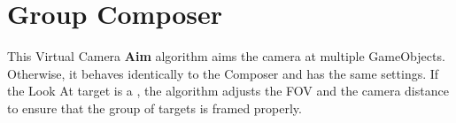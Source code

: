 \chapter{Group Composer}
\hypertarget{md__hey_tea_9_2_library_2_package_cache_2com_8unity_8cinemachine_0d2_89_87_2_documentation_0i_2_cinemachine_aim_group_composer}{}\label{md__hey_tea_9_2_library_2_package_cache_2com_8unity_8cinemachine_0d2_89_87_2_documentation_0i_2_cinemachine_aim_group_composer}
\label{md__hey_tea_9_2_library_2_package_cache_2com_8unity_8cinemachine_0d2_89_87_2_documentation_0i_2_cinemachine_aim_group_composer_autotoc_md492}%
%
 This Virtual Camera {\bfseries{Aim}} algorithm aims the camera at multiple Game\+Objects. Otherwise, it behaves identically to the Composer and has the same settings. If the Look At target is a , the algorithm adjusts the FOV and the camera distance to ensure that the group of targets is framed properly. 